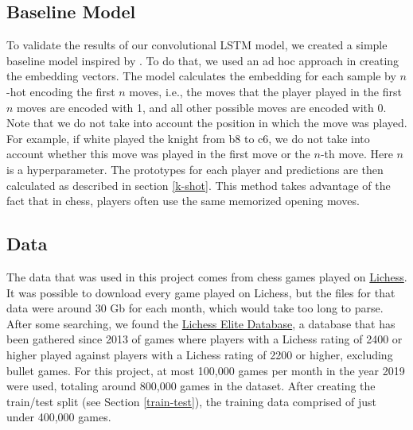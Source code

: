\subsection{Baseline Model}
To validate the results of our convolutional LSTM model, we created a simple baseline model inspired by \cite{main_article}. To do that, we used an ad hoc approach in creating the embedding vectors. The model calculates the embedding for each sample by $n$-hot encoding the first $n$ moves, i.e., the moves that the player played in the first $n$ moves are encoded with 1, and all other possible moves are encoded with 0. Note that we do not take into account the position in which the move was played. For example, if white played the knight from b8 to c6, we do not take into account whether this move was played in the first move or the $n$-th move.
Here $n$ is a hyperparameter. The prototypes for each player and predictions are then calculated as described in section \ref{k-shot}.
This method takes advantage of the fact that in chess, players often use the same memorized opening moves.

\subsection{Data}\label{data}
The data that was used in this project comes from chess games played on \href{https://lichess.org/}{Lichess}. It was possible to download every game played on Lichess, but the files for that data were around 30 Gb for each month, which would take too long to parse. After some searching, we found the \href{https://database.nikonoel.fr/}{Lichess Elite Database}, a database that has been gathered since 2013 of games where players with a Lichess rating of 2400 or higher played against players with a Lichess rating of 2200 or higher, excluding bullet games. For this project, at most 100,000 games per month in the year 2019 were used, totaling around 800,000 games in the dataset. After creating the train/test split (see Section \ref{train-test}), the training data comprised of just under 400,000 games.


